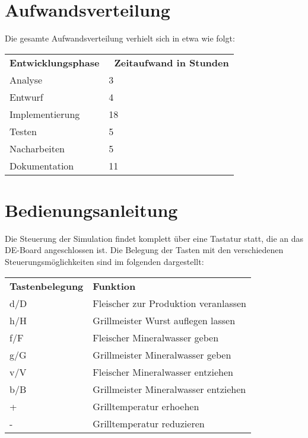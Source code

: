 \section{Aufwandsverteilung}

Die gesamte Aufwandsverteilung verhielt sich in etwa wie folgt:

\begin{tabular}{ll}
	\textbf{Entwicklungsphase} & \textbf{~Zeitaufwand in Stunden} \\
 	Analyse & 3 \\
 	Entwurf & 4 \\
 	Implementierung & 18 \\
 	Testen & 5 \\
 	Nacharbeiten & 5 \\
 	Dokumentation & 11
\end{tabular}

\section{Bedienungsanleitung}

Die Steuerung der Simulation findet komplett über eine Tastatur statt, die an das DE-Board angeschlossen ist. Die Belegung der Tasten mit den verschiedenen Steuerungsmöglichkeiten sind im folgenden dargestellt:\\

\begin{tabular}{ll}
	\textbf{Tastenbelegung} & \textbf{Funktion} \\
	d/D & Fleischer zur Produktion veranlassen \\
	h/H & Grillmeister Wurst auflegen lassen \\
	f/F & Fleischer Mineralwasser geben \\
	g/G & Grillmeister Mineralwasser geben \\
	v/V & Fleischer Mineralwasser entziehen \\
	b/B & Grillmeister Mineralwasser entziehen \\
	+ & Grilltemperatur erhoehen \\
	- & Grilltemperatur reduzieren
\end{tabular}
